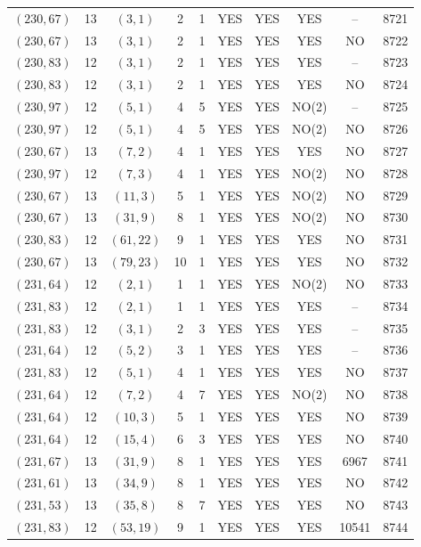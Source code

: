\begin{longtable}{|c|c|c|c|c|c|c|c|c|c|}
$(230, 67)$ & 13 & $(3, 1)$ & 2 & 1 & YES & YES & YES & -- & 8721\\
$(230, 67)$ & 13 & $(3, 1)$ & 2 & 1 & YES & YES & YES & NO & 8722\\
$(230, 83)$ & 12 & $(3, 1)$ & 2 & 1 & YES & YES & YES & -- & 8723\\
$(230, 83)$ & 12 & $(3, 1)$ & 2 & 1 & YES & YES & YES & NO & 8724\\
$(230, 97)$ & 12 & $(5, 1)$ & 4 & 5 & YES & YES & NO(2) & -- & 8725\\
$(230, 97)$ & 12 & $(5, 1)$ & 4 & 5 & YES & YES & NO(2) & NO & 8726\\
$(230, 67)$ & 13 & $(7, 2)$ & 4 & 1 & YES & YES & YES & NO & 8727\\
$(230, 97)$ & 12 & $(7, 3)$ & 4 & 1 & YES & YES & NO(2) & NO & 8728\\
$(230, 67)$ & 13 & $(11, 3)$ & 5 & 1 & YES & YES & NO(2) & NO & 8729\\
$(230, 67)$ & 13 & $(31, 9)$ & 8 & 1 & YES & YES & NO(2) & NO & 8730\\
$(230, 83)$ & 12 & $(61, 22)$ & 9 & 1 & YES & YES & YES & NO & 8731\\
$(230, 67)$ & 13 & $(79, 23)$ & 10 & 1 & YES & YES & YES & NO & 8732\\
$(231, 64)$ & 12 & $(2, 1)$ & 1 & 1 & YES & YES & NO(2) & NO & 8733\\
$(231, 83)$ & 12 & $(2, 1)$ & 1 & 1 & YES & YES & YES & -- & 8734\\
$(231, 83)$ & 12 & $(3, 1)$ & 2 & 3 & YES & YES & YES & -- & 8735\\
$(231, 64)$ & 12 & $(5, 2)$ & 3 & 1 & YES & YES & YES & -- & 8736\\
$(231, 83)$ & 12 & $(5, 1)$ & 4 & 1 & YES & YES & YES & NO & 8737\\
$(231, 64)$ & 12 & $(7, 2)$ & 4 & 7 & YES & YES & NO(2) & NO & 8738\\
$(231, 64)$ & 12 & $(10, 3)$ & 5 & 1 & YES & YES & YES & NO & 8739\\
$(231, 64)$ & 12 & $(15, 4)$ & 6 & 3 & YES & YES & YES & NO & 8740\\
$(231, 67)$ & 13 & $(31, 9)$ & 8 & 1 & YES & YES & YES & 6967 & 8741\\
$(231, 61)$ & 13 & $(34, 9)$ & 8 & 1 & YES & YES & YES & NO & 8742\\
$(231, 53)$ & 13 & $(35, 8)$ & 8 & 7 & YES & YES & YES & NO & 8743\\
$(231, 83)$ & 12 & $(53, 19)$ & 9 & 1 & YES & YES & YES & 10541 & 8744\\

\end{longtable}
